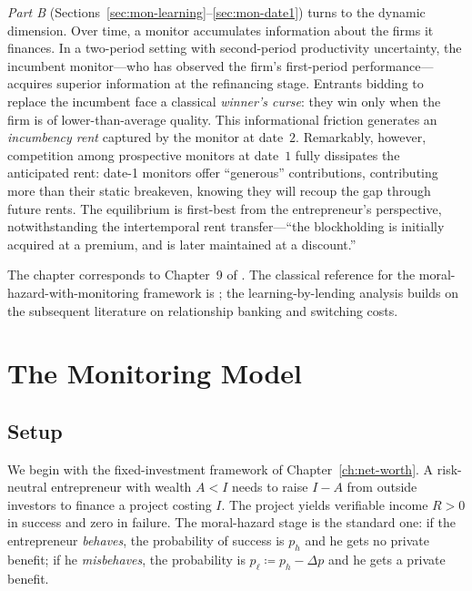 \documentclass[11pt,a4paper,oneside]{book}
\theoremstyle{plain}
\theoremstyle{definition}
\theoremstyle{remark}
\numberwithin{equation}{chapter}
\begin{document}
\emph{Part B} (Sections~\ref{sec:mon-learning}--\ref{sec:mon-date1}) turns to the dynamic dimension.
Over time, a monitor accumulates information about the firms it finances.
In a two-period setting with second-period productivity uncertainty, the incumbent monitor---who has observed the firm's first-period performance---acquires superior information at the refinancing stage.
Entrants bidding to replace the incumbent face a classical \emph{winner's curse}: they win only when the firm is of lower-than-average quality.
This informational friction generates an \emph{incumbency rent} captured by the monitor at date~$2$.
Remarkably, however, competition among prospective monitors at date~$1$ fully dissipates the anticipated rent: date-1 monitors offer ``generous'' contributions, contributing more than their static breakeven, knowing they will recoup the gap through future rents.
The equilibrium is first-best from the entrepreneur's perspective, notwithstanding the intertemporal rent transfer---``the blockholding is initially acquired at a premium, and is later maintained at a discount.''

The chapter corresponds to Chapter~9 of \citet{Tirole2006}.
The classical reference for the moral-hazard-with-monitoring framework is \citet{HolmstromTirole1997}; the learning-by-lending analysis builds on the subsequent literature on relationship banking and switching costs.

\section{The Monitoring Model}
\label{sec:mon-model}

\subsection{Setup}

We begin with the fixed-investment framework of Chapter~\ref{ch:net-worth}.
A risk-neutral entrepreneur with wealth $A < I$ needs to raise $I - A$ from outside investors to finance a project costing $I$.
The project yields verifiable income $R > 0$ in success and zero in failure.
The moral-hazard stage is the standard one: if the entrepreneur \emph{behaves}, the probability of success is $p_h$ and he gets no private benefit; if he \emph{misbehaves}, the probability is $p_\ell \coloneqq p_h - \Delta p$ and he gets a private benefit.
\end{document}
